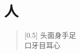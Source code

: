 \documentclass[12pt,UTF-8,openany]{ctexbook}
\begin{document}
\clearpage

\begin{center}
    
\end{center}


\hanzibox{}\hanzibox{}\hanzibox{}\hanzibox{}\hspace{1em}\hanzibox{}\hanzibox{}\hanzibox{}\hanzibox{}

\hanzibox{}\hanzibox{}\hanzibox{}\hanzibox{}\hspace{1em}\hanzibox{}\hanzibox{}\hanzibox{}\hanzibox{}

\hanzibox{}\hanzibox{}\hanzibox{}\hanzibox{}\hspace{1em}




\chapter{人}

\begin{large}
    
    \begin{verse}[0.5\linewidth]
        头面身手足 \\
        口牙目耳心
    \end{verse}
    
\end{large}


\clearpage

\begin{center}
    
    
    
\end{center}


\hanzibox{}\hanzibox{}\hanzibox{}\hanzibox{}\hspace{1em}\hanzibox{}\hanzibox{}\hanzibox{}\hanzibox{}

\hanzibox{}\hanzibox{}\hanzibox{}\hanzibox{}\hspace{1em}\hanzibox{}\hanzibox{}\hanzibox{}\hanzibox{}

\hanzibox{}\hanzibox{}\hanzibox{}\hanzibox{}\hspace{1em}\hanzibox{}\hanzibox{}\hanzibox{}\hanzibox{}
\end{document}
